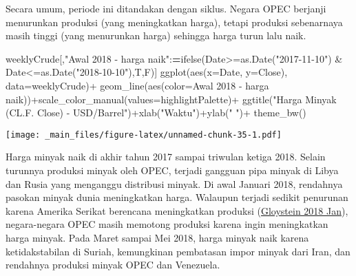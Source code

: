 \documentclass[
]{book}
\newenvironment{Shaded}{\begin{snugshade}}{\end{snugshade}}
\newcommand{\AttributeTok}[1]{\textcolor[rgb]{0.77,0.63,0.00}{#1}}
\newcommand{\ErrorTok}[1]{\textcolor[rgb]{0.64,0.00,0.00}{\textbf{#1}}}
\newcommand{\FunctionTok}[1]{\textcolor[rgb]{0.00,0.00,0.00}{#1}}
\newcommand{\NormalTok}[1]{#1}
\newcommand{\SpecialCharTok}[1]{\textcolor[rgb]{0.00,0.00,0.00}{#1}}
\newcommand{\StringTok}[1]{\textcolor[rgb]{0.31,0.60,0.02}{#1}}
\begin{document}
Secara umum, periode ini ditandakan dengan siklus. Negara OPEC berjanji menurunkan produksi (yang meningkatkan harga), tetapi produksi sebenarnaya masih tinggi (yang menurunkan harga) sehingga harga turun lalu naik.

\begin{Shaded}
\begin{Highlighting}[]
\NormalTok{weeklyCrude[,}\StringTok{"Awal 2018 {-} harga naik"}\SpecialCharTok{:}\ErrorTok{=}\FunctionTok{ifelse}\NormalTok{(Date}\SpecialCharTok{\textgreater{}=}\FunctionTok{as.Date}\NormalTok{(}\StringTok{"2017{-}11{-}10"}\NormalTok{) }\SpecialCharTok{\&}\NormalTok{ Date}\SpecialCharTok{\textless{}=}\FunctionTok{as.Date}\NormalTok{(}\StringTok{"2018{-}10{-}10"}\NormalTok{),T,F)]}
\FunctionTok{ggplot}\NormalTok{(}\FunctionTok{aes}\NormalTok{(}\AttributeTok{x=}\NormalTok{Date, }\AttributeTok{y=}\NormalTok{Close),}
       \AttributeTok{data=}\NormalTok{weeklyCrude)}\SpecialCharTok{+}
  \FunctionTok{geom\_line}\NormalTok{(}\FunctionTok{aes}\NormalTok{(}\AttributeTok{color=}\StringTok{\textasciigrave{}}\AttributeTok{Awal 2018 {-} harga naik}\StringTok{\textasciigrave{}}\NormalTok{))}\SpecialCharTok{+}\FunctionTok{scale\_color\_manual}\NormalTok{(}\AttributeTok{values=}\NormalTok{highlightPalette)}\SpecialCharTok{+}
  \FunctionTok{ggtitle}\NormalTok{(}\StringTok{"Harga Minyak (CL.F. Close) {-} USD/Barrel"}\NormalTok{)}\SpecialCharTok{+}\FunctionTok{xlab}\NormalTok{(}\StringTok{"Waktu"}\NormalTok{)}\SpecialCharTok{+}\FunctionTok{ylab}\NormalTok{(}\StringTok{" "}\NormalTok{)}\SpecialCharTok{+}
  \FunctionTok{theme\_bw}\NormalTok{()}
\end{Highlighting}
\end{Shaded}

\texttt{[image: \_main\_files/figure-latex/unnamed-chunk-35-1.pdf]}

Harga minyak naik di akhir tahun 2017 sampai triwulan ketiga 2018. Selain turunnya produksi minyak oleh OPEC, terjadi gangguan pipa minyak di Libya dan Rusia yang menganggu distribusi minyak. Di awal Januari 2018, rendahnya pasokan minyak dunia meningkatkan harga. Walaupun terjadi sedikit penurunan karena Amerika Serikat berencana meningkatkan produksi (\protect\hyperlink{ref-reu_oil_2018}{Gloystein 2018 Jan}), negara-negara OPEC masih memotong produksi karena ingin meningkatkan harga minyak. Pada Maret sampai Mei 2018, harga minyak naik karena ketidakstabilan di Suriah, kemungkinan pembatasan impor minyak dari Iran, dan rendahnya produksi minyak OPEC dan Venezuela.
\end{document}
